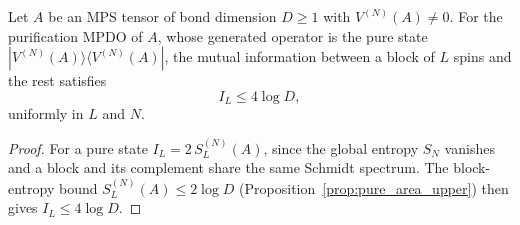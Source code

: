 \begin{proposition}\label{prop:pure_mutual_info_bound}
    \leanok
    Let $A$ be an MPS tensor of bond dimension $D\ge 1$ with $V^{(N)}(A)\neq 0$.
    For the purification MPDO of $A$, whose generated operator is the pure state
    $|V^{(N)}(A)\rangle\langle V^{(N)}(A)|$, the mutual information between a block
    of $L$ spins and the rest satisfies
    \[
        I_L \le 4\log D,
    \]
    uniformly in $L$ and $N$.
\end{proposition}
\begin{proof}\leanok
    For a pure state $I_L = 2\,S_L^{(N)}(A)$, since the global entropy $S_N$
    vanishes and a block and its complement share the same Schmidt spectrum. The
    block-entropy bound $S_L^{(N)}(A) \le 2\log D$
    (Proposition~\ref{prop:pure_area_upper}) then gives $I_L \le 4\log D$.
\end{proof}
